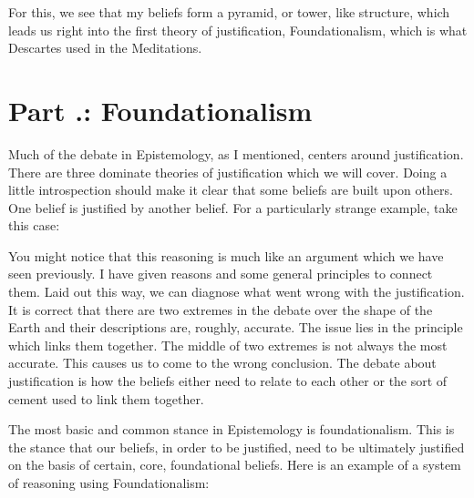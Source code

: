 For this, we see that my beliefs form a pyramid, or tower, like structure, which leads us right into the first theory of justification, Foundationalism, which is what Descartes used in the Meditations.

\section{Part \thechapcount.\theseccount: Foundationalism}

Much of the debate in Epistemology, as I mentioned, centers around justification. There are three dominate theories of justification which we will cover. Doing a little introspection should make it clear that some beliefs are built upon others. One belief is justified by another belief. For a particularly strange example, take this case: 


You might notice that this reasoning is much like an argument which we have seen previously. I have given reasons and some general principles to connect them. Laid out this way, we can diagnose what went wrong with the justification. It is correct that there are two extremes in the debate over the shape of the Earth and their descriptions are, roughly, accurate. The issue lies in the principle which links them together. The middle of two extremes is not always the most accurate. This causes us to come to the wrong conclusion. The debate about justification is how the beliefs either need to relate to each other or the sort of cement used to link them together.

The most basic and common stance in Epistemology is \Gls{foundationalism}. This is the stance that our beliefs, in order to be justified, need to be ultimately justified on the basis of certain, core, foundational beliefs. Here is an example of a system of reasoning using Foundationalism: 

